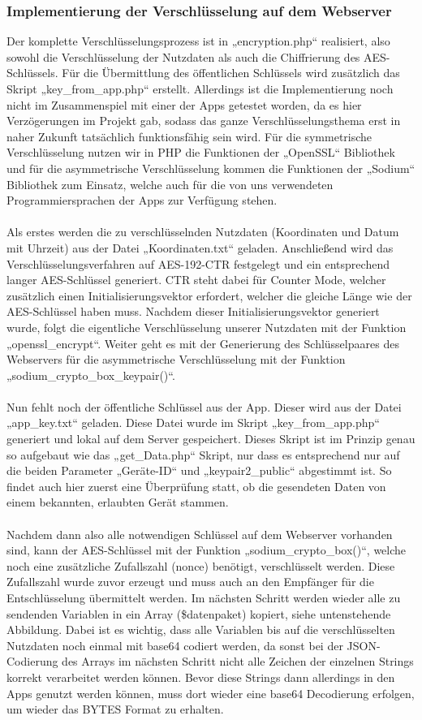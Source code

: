 \subsubsection{Implementierung der Verschlüsselung auf dem Webserver }
Der komplette Verschlüsselungsprozess ist in „encryption.php“ realisiert, also sowohl die Verschlüsselung der Nutzdaten als auch die Chiffrierung des AES-Schlüssels. Für die Übermittlung des öffentlichen Schlüssels wird zusätzlich das Skript „key\_from\_app.php“ erstellt. Allerdings ist die Implementierung noch nicht im Zusammenspiel mit einer der Apps getestet worden, da es hier Verzögerungen im Projekt gab, sodass das ganze Verschlüsselungsthema erst in naher Zukunft tatsächlich funktionsfähig sein wird. Für die symmetrische Verschlüsselung nutzen wir in PHP die Funktionen der „OpenSSL“ Bibliothek und für die asymmetrische Verschlüsselung kommen die Funktionen der „Sodium“ Bibliothek zum Einsatz, welche auch für die von uns verwendeten Programmiersprachen der Apps zur Verfügung stehen.
\\
\\
Als erstes werden die zu verschlüsselnden Nutzdaten (Koordinaten und Datum mit Uhrzeit) aus der Datei „Koordinaten.txt“ geladen. Anschließend wird das Verschlüsselungsverfahren auf AES-192-CTR festgelegt und ein entsprechend langer AES-Schlüssel generiert. CTR steht dabei für Counter Mode, welcher zusätzlich einen Initialisierungsvektor erfordert, welcher die gleiche Länge wie der AES-Schlüssel haben muss. Nachdem dieser Initialisierungsvektor generiert wurde, folgt die eigentliche Verschlüsselung unserer Nutzdaten mit der Funktion „openssl\_encrypt“. Weiter geht es mit der Generierung des Schlüsselpaares des Webservers für die asymmetrische Verschlüsselung mit der Funktion „sodium\_crypto\_box\_keypair()“.
\\
\\
Nun fehlt noch der öffentliche Schlüssel aus der App. Dieser wird aus der Datei „app\_key.txt“ geladen. Diese Datei wurde im Skript „key\_from\_app.php“ generiert und lokal auf dem Server gespeichert. Dieses Skript ist im Prinzip genau so aufgebaut wie das „get\_Data.php“ Skript, nur dass es entsprechend nur auf die beiden Parameter „Geräte-ID“ und „keypair2\_public“ abgestimmt ist. So findet auch hier zuerst eine Überprüfung statt, ob die gesendeten Daten von einem bekannten, erlaubten Gerät stammen.
\\
\\
Nachdem dann also alle notwendigen Schlüssel auf dem Webserver vorhanden sind, kann der AES-Schlüssel mit der Funktion „sodium\_crypto\_box()“, welche noch eine zusätzliche Zufallszahl (nonce) benötigt, verschlüsselt werden. Diese Zufallszahl wurde zuvor erzeugt und muss auch an den Empfänger für die Entschlüsselung übermittelt werden. Im nächsten Schritt werden wieder alle zu sendenden Variablen in ein Array (\$datenpaket) kopiert, siehe untenstehende Abbildung. Dabei ist es wichtig, dass alle Variablen bis auf die verschlüsselten Nutzdaten noch einmal mit base64 codiert werden, da sonst bei der JSON-Codierung des Arrays im nächsten Schritt nicht alle Zeichen der einzelnen Strings korrekt verarbeitet werden können. Bevor diese Strings dann allerdings in den Apps genutzt werden können, muss dort wieder eine base64 Decodierung erfolgen, um wieder das BYTES Format zu erhalten.
